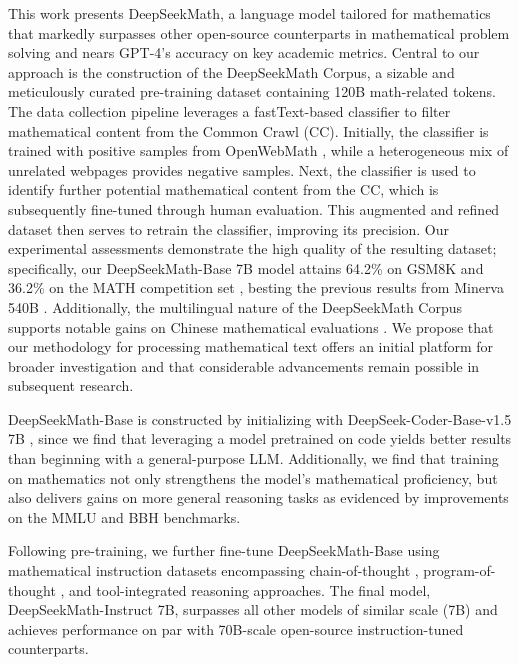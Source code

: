 This work presents DeepSeekMath, a language model tailored for mathematics that markedly surpasses other open-source counterparts in mathematical problem solving and nears GPT-4's accuracy on key academic metrics. Central to our approach is the construction of the DeepSeekMath Corpus, a sizable and meticulously curated pre-training dataset containing 120B math-related tokens. The data collection pipeline leverages a fastText-based classifier \citep{joulin2016fasttext} to filter mathematical content from the Common Crawl (CC). Initially, the classifier is trained with positive samples from OpenWebMath \citep{openwebmath}, while a heterogeneous mix of unrelated webpages provides negative samples. Next, the classifier is used to identify further potential mathematical content from the CC, which is subsequently fine-tuned through human evaluation. This augmented and refined dataset then serves to retrain the classifier, improving its precision. Our experimental assessments demonstrate the high quality of the resulting dataset; specifically, our DeepSeekMath-Base 7B model attains 64.2\% on GSM8K \citep{gsm8k} and 36.2\% on the MATH competition set \citep{MATH}, besting the previous results from Minerva 540B \citep{minerva}. Additionally, the multilingual nature of the DeepSeekMath Corpus supports notable gains on Chinese mathematical evaluations \citep{wei2023cmath,agieval}. We propose that our methodology for processing mathematical text offers an initial platform for broader investigation and that considerable advancements remain possible in subsequent research.

DeepSeekMath-Base is constructed by initializing with DeepSeek-Coder-Base-v1.5 7B \citep{deepseek-coder}, since we find that leveraging a model pretrained on code yields better results than beginning with a general-purpose LLM. Additionally, we find that training on mathematics not only strengthens the model’s mathematical proficiency, but also delivers gains on more general reasoning tasks as evidenced by improvements on the MMLU \citep{mmlu} and BBH \citep{bbh} benchmarks.

Following pre-training, we further fine-tune DeepSeekMath-Base using mathematical instruction datasets encompassing chain-of-thought \citep{cot}, program-of-thought \citep{pot,pal}, and tool-integrated reasoning \citep{tora} approaches. The final model, DeepSeekMath-Instruct 7B, surpasses all other models of similar scale (7B) and achieves performance on par with 70B-scale open-source instruction-tuned counterparts.


